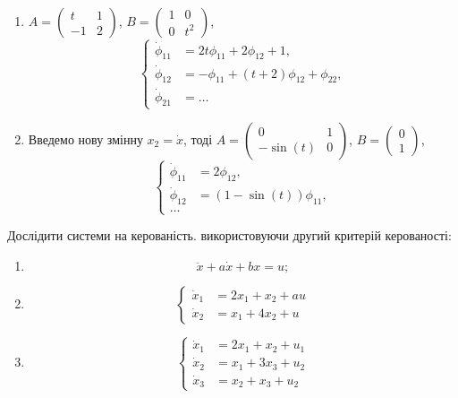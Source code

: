 \begin{solution}
	\begin{enumerate}
		\item $A = \begin{pmatrix} t & 1 \\ -1 & 2 \end{pmatrix}$, $B = \begin{pmatrix} 1 & 0 \\ 0 & t^2 \end{pmatrix}$, \[
		\left\{
			\begin{aligned}
				\dot \phi_{11} &= 2 t \phi_{11} + 2 \phi_{12} + 1, \\
				\dot \phi_{12} &= - \phi_{11} + (t + 2) \phi_{12} + \phi_{22}, \\
				\dot \phi_{21} &= \ldots 
			\end{aligned}
		\right.
		\]

		\item Введемо нову змінну $x_2 = \dot x$, тоді $A = \begin{pmatrix} 0 & 1 \\ -\sin(t) & 0 \end{pmatrix}$, $B = \begin{pmatrix} 0 \\ 1 \end{pmatrix}$, \[
		\left\{
			\begin{aligned}
				\dot \phi_{11} &= 2 \phi_{12}, \\
				\dot \phi_{12} &= (1 - \sin(t)) \phi_{11}, \\
				\ldots 
			\end{aligned}
		\right.
		\]
	\end{enumerate}
\end{solution}

\begin{problem}
\end{problem}

\begin{solution}
\end{solution}


\begin{problem}
    Дослідити системи на керованість. використовуючи другий критерій керованості:
    \begin{enumerate}
        \item \[\ddot x + a \dot x + b x = u; \]
        \item \[ \left\{ \begin{aligned} \dot x_1 &= 2x_1 + x_2 + au \\ \dot x_2 &= x_1 + 4 x_2 + u \end{aligned} \right. \]
        \item \[ \left\{ \begin{aligned} \dot x_1 &= 2x_1 + x_2 + u_1 \\ \dot x_2 &= x_1 + 3 x_3 + u_2 \\ \dot x_3 &= x_2 + x_3 + u_2  \end{aligned} \right. \]
    \end{enumerate}
\end{problem}

